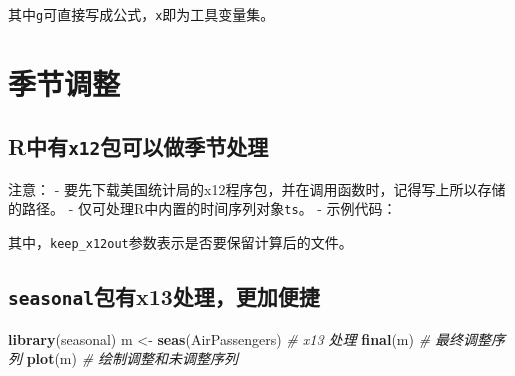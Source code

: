 \documentclass[
]{book}
\newenvironment{Shaded}{\begin{snugshade}}{\end{snugshade}}
\newcommand{\CharTok}[1]{\textcolor[rgb]{0.31,0.60,0.02}{#1}}
\newcommand{\CommentTok}[1]{\textcolor[rgb]{0.56,0.35,0.01}{\textit{#1}}}
\newcommand{\DataTypeTok}[1]{\textcolor[rgb]{0.13,0.29,0.53}{#1}}
\newcommand{\KeywordTok}[1]{\textcolor[rgb]{0.13,0.29,0.53}{\textbf{#1}}}
\newcommand{\NormalTok}[1]{#1}
\newcommand{\OperatorTok}[1]{\textcolor[rgb]{0.81,0.36,0.00}{\textbf{#1}}}
\newcommand{\OtherTok}[1]{\textcolor[rgb]{0.56,0.35,0.01}{#1}}
\newcommand{\StringTok}[1]{\textcolor[rgb]{0.31,0.60,0.02}{#1}}
\begin{document}
其中\texttt{g}可直接写成公式，\texttt{x}即为工具变量集。

\hypertarget{ux5b63ux8282ux8c03ux6574}{%
\section{季节调整}\label{ux5b63ux8282ux8c03ux6574}}

\hypertarget{rux4e2dux6709x12ux5305ux53efux4ee5ux505aux5b63ux8282ux5904ux7406}{%
\subsection{\texorpdfstring{R中有\texttt{x12}包可以做季节处理}{R中有x12包可以做季节处理}}\label{rux4e2dux6709x12ux5305ux53efux4ee5ux505aux5b63ux8282ux5904ux7406}}

注意：
- 要先下载美国统计局的x12程序包，并在调用函数时，记得写上所以存储的路径。
- 仅可处理R中内置的时间序列对象\texttt{ts}。
- 示例代码：

\begin{Shaded}
\end{Shaded}

其中，\texttt{keep\_x12out}参数表示是否要保留计算后的文件。

\hypertarget{seasonalux5305ux6709x13ux5904ux7406ux66f4ux52a0ux4fbfux6377}{%
\subsection{\texorpdfstring{\texttt{seasonal}包有x13处理，更加便捷}{seasonal包有x13处理，更加便捷}}\label{seasonalux5305ux6709x13ux5904ux7406ux66f4ux52a0ux4fbfux6377}}

\begin{Shaded}
\begin{Highlighting}[]
\KeywordTok{library}\NormalTok{(seasonal)}
\NormalTok{m <-}\StringTok{ }\KeywordTok{seas}\NormalTok{(AirPassengers) }\CommentTok{# x13 处理}
\KeywordTok{final}\NormalTok{(m) }\CommentTok{# 最终调整序列}
\KeywordTok{plot}\NormalTok{(m) }\CommentTok{# 绘制调整和未调整序列}
\end{Highlighting}
\end{Shaded}

  
\end{document}

